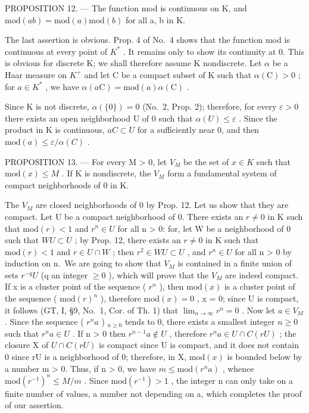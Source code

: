 PROPOSITION 12. --- The function mod is continuous on K, and \(\text{mod}(ab) = \text{mod}(a)\text{mod}(b)\) for all a, b in K.

The last assertion is obvious. Prop. 4 of No.~4 shows that the function mod is continuous at every point of \(K^{*}\) . It remains only to show its continuity at 0. This is obvious for discrete K; we shall therefore assume K nondiscrete. Let \(\alpha\) be a Haar measure on \(K^{+}\) and let C be a compact subset of K such that \(\alpha(\mathrm{C}) > 0\) ; for \(a \in K^{*}\) , we have \(\alpha(a\mathrm{C}) = \mathrm{mod}(a)\alpha(\mathrm{C})\) .

Since K is not discrete, \(\alpha(\{0\}) = 0\) (No.~2, Prop. 2); therefore, for every \(\varepsilon > 0\) there exists an open neighborhood U of 0 such that \(\alpha(U) \leqslant \varepsilon\) . Since the product in K is continuous, \(aC \subset U\) for a sufficiently near 0, and then \(\text{mod}(a) \leqslant \varepsilon / \alpha(C)\) .

PROPOSITION 13. --- For every M \textgreater{} 0, let \(V_{M}\) be the set of \(x \in K\) such that \(\text{mod}(x) \leqslant M\) . If K is nondiscrete, the \(V_{M}\) form a fundamental system of compact neighborhoods of 0 in K.

The \(V_{M}\) are closed neighborhoods of 0 by Prop. 12. Let us show that they are compact. Let U be a compact neighborhood of 0. There exists an \(r \neq 0\) in K such that \(\text{mod}(r) < 1\) and \(r^{n} \in U\) for all n \textgreater{} 0: for, let W be a neighborhood of 0 such that \(WU \subset U\) ; by Prop. 12, there exists an \(r \neq 0\) in K such that \(\text{mod}(r) < 1\) and \(r \in U \cap W\) ; then \(r^{2} \in WU \subset U\) , and \(r^{n} \in U\) for all n \textgreater{} 0 by induction on n.~We are going to show that \(V_{M}\) is contained in a finite union of sets \(r^{-q}U\) (q an integer \(\geqslant 0\) ), which will prove that the \(V_{M}\) are indeed compact. If x is a cluster point of the sequence ( \(r^{n}\) ), then \(\text{mod}(x)\) is a cluster point of the sequence ( \(\text{mod}(r)^{n}\) ), therefore \(\text{mod}(x) = 0\) , x = 0; since U is compact, it follows (GT, I, §9, No.~1, Cor. of Th. 1) that \(\lim_{n \to \infty} r^{n} = 0\) . Now let \(a \in V_{M}\) . Since the sequence ( \(r^{n}a\) ) \(_{n \geqslant 0}\) tends to 0, there exists a smallest integer \(n \geqslant 0\) such that \(r^{n}a \in U\) . If n \textgreater{} 0 then \(r^{n-1}a \notin U\) , therefore \(r^{n}a \in U \cap C(rU)\) ; the closure X of \(U \cap C(rU)\) is compact since U is compact, and it does not contain 0 since rU is a neighborhood of 0; therefore, in X, \(\text{mod}(x)\) is bounded below by a number m \textgreater{} 0. Thus, if n \textgreater{} 0, we have \(m \leqslant \text{mod}(r^{n}a)\) , whence \(\text{mod}(r^{-1})^{n} \leqslant M/m\) . Since \(\text{mod}(r^{-1}) > 1\) , the integer n can only take on a finite number of values, a number not depending on a, which completes the proof of our assertion.

